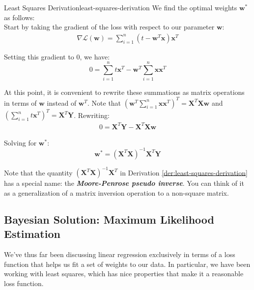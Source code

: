 \begin{derivation}{Least Squares Derivation}{least-squares-derivation}
    We find the optimal weights $\textbf{w}^{*}$ as follows: \\

    Start by taking the gradient of the loss with respect to our parameter $\textbf{w}$:
    \begin{align*}
        \nabla \mathcal{L}(\textbf{w}) = \sum_{i=1}^{n} (t - \textbf{w}^{T}\textbf{x})\textbf{x}^{T}
    \end{align*}

    Setting this gradient to 0, we have:
    \begin{equation} \label{least-squares-solving-for-w}
        0 = \sum_{i=1}^{n} t \textbf{x}^{T} - \textbf{w}^{T} \sum_{i=1}^{n} \textbf{x}\textbf{x}^{T}
    \end{equation}

    At this point, it is convenient to rewrite these summations as matrix operations in terms of $\textbf{w}$ instead of $\textbf{w}^{T}$. Note that $(\textbf{w}^{T} \sum_{i=1}^{n} \textbf{x}\textbf{x}^{T})^{T} = \textbf{X}^{T}\textbf{X}\textbf{w}$ and $(\sum_{i=1}^{n} t \textbf{x}^{T})^{T} = \textbf{X}^{T}\textbf{Y}$. Rewriting:
    \begin{align*}
        0 = \textbf{X}^{T}\textbf{Y} - \textbf{X}^{T}\textbf{X}\textbf{w}
    \end{align*}

    Solving for $\textbf{w}^{*}$:
    \begin{equation} \label{least-squares-solved-for-w}
        \textbf{w}^{*} = (\textbf{X}^{T}\textbf{X})^{-1}\textbf{X}^{T}\textbf{Y}
    \end{equation}
\end{derivation}

Note that the quantity $(\textbf{X}^{T}\textbf{X})^{-1}\textbf{X}^{T}$ in Derivation \ref{der:least-squares-derivation} has a special name: the \textbf{\textit{Moore-Penrose pseudo inverse}}. You can think of it as a generalization of a matrix inversion operation to a non-square matrix.

\subsection{Bayesian Solution: Maximum Likelihood Estimation}
We've thus far been discussing linear regression exclusively in terms of a loss function that helps us fit a set of weights to our data. In particular, we have been working with least squares, which has nice properties that make it a reasonable loss function.

